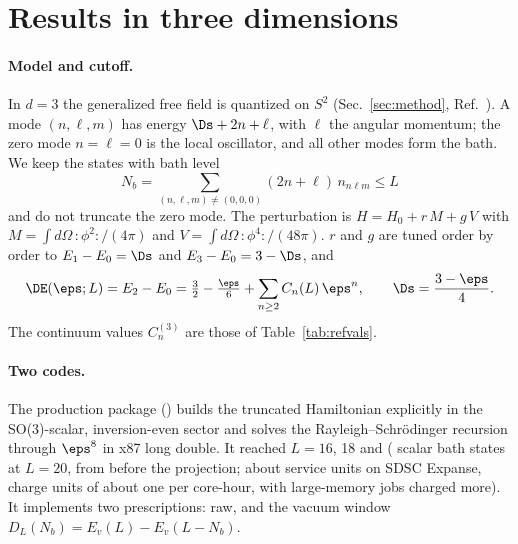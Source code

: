 \section{Results in three dimensions}\label{d3:sec}

\paragraph{Model and cutoff.}
In $d=3$ the generalized free field is quantized on $S^2$ (Sec.~\ref{sec:method}, Ref.~\cite{Hogervorst:2014rta}). A
mode $(n,\ell,m)$ has energy $\Ds+2n+\ell$, with $\ell$ the angular momentum; the zero mode $n=\ell=0$ is the local
oscillator, and all other modes form the bath. We keep the states with bath level
\begin{equation}
 N_b=\sum_{(n,\ell,m)\neq(0,0,0)}(2n+\ell)\,n_{n\ell m}\le L
 \label{d3:eq:cutoff}
\end{equation}
and do not truncate the zero mode. The perturbation is $H=H_0+r\,M+g\,V$ with
$M=\int d\Omega\,{:}\phi^2{:}/(4\pi)$ and $V=\int d\Omega\,{:}\phi^4{:}/(48\pi)$. $r$ and $g$ are tuned order by order
to $E_1-E_0=\Ds$ and $E_3-E_0=3-\Ds$, and
\begin{equation}
 \DE(\eps;L)=E_2-E_0=\tfrac32-\tfrac{\eps}{6}+\sum_{n\ge2}C_n(L)\,\eps^n,\qquad \Ds=\frac{3-\eps}{4}.
 \label{d3:eq:Cn}
\end{equation}
The continuum values $C_n^{(3)}$ are those of Table~\ref{tab:refvals}.

\paragraph{Two codes.}
The production package () builds the truncated Hamiltonian explicitly in the SO(3)-scalar,
inversion-even sector and solves the Rayleigh--Schr\"odinger recursion through $\eps^8$ in x87 long double. It reached
$L=16$, 18 and \HTpThreeLmax{} (\NThreeScalarTwenty{} scalar bath states at $L=20$, from \NThreeStatesTwenty{} before
the projection; about \NThreeSU{} service units on SDSC Expanse, charge units of about one per core-hour, with
large-memory jobs charged more). It implements two prescriptions: raw, and the vacuum window
$D_L(N_b)=E_v(L)-E_v(L-N_b)$.

